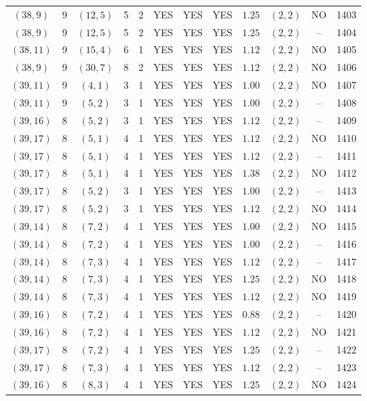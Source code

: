 \begin{longtable}{|c|c|c|c|c|c|c|c|c|c|c|c|}
$(38,9)$ & 9 & $(12,5)$ & 5 & 2 & YES & YES & YES & $1.25$ & $(2,2)$ & NO & 1403\\
$(38,9)$ & 9 & $(12,5)$ & 5 & 2 & YES & YES & YES & $1.25$ & $(2,2)$ & -- & 1404\\
$(38,11)$ & 9 & $(15,4)$ & 6 & 1 & YES & YES & YES & $1.12$ & $(2,2)$ & NO & 1405\\
$(38,9)$ & 9 & $(30,7)$ & 8 & 2 & YES & YES & YES & $1.12$ & $(2,2)$ & NO & 1406\\
$(39,11)$ & 9 & $(4,1)$ & 3 & 1 & YES & YES & YES & $1.00$ & $(2,2)$ & NO & 1407\\
$(39,11)$ & 9 & $(5,2)$ & 3 & 1 & YES & YES & YES & $1.00$ & $(2,2)$ & -- & 1408\\
$(39,16)$ & 8 & $(5,2)$ & 3 & 1 & YES & YES & YES & $1.12$ & $(2,2)$ & -- & 1409\\
$(39,17)$ & 8 & $(5,1)$ & 4 & 1 & YES & YES & YES & $1.12$ & $(2,2)$ & NO & 1410\\
$(39,17)$ & 8 & $(5,1)$ & 4 & 1 & YES & YES & YES & $1.12$ & $(2,2)$ & -- & 1411\\
$(39,17)$ & 8 & $(5,1)$ & 4 & 1 & YES & YES & YES & $1.38$ & $(2,2)$ & NO & 1412\\
$(39,17)$ & 8 & $(5,2)$ & 3 & 1 & YES & YES & YES & $1.00$ & $(2,2)$ & -- & 1413\\
$(39,17)$ & 8 & $(5,2)$ & 3 & 1 & YES & YES & YES & $1.12$ & $(2,2)$ & NO & 1414\\
$(39,14)$ & 8 & $(7,2)$ & 4 & 1 & YES & YES & YES & $1.00$ & $(2,2)$ & NO & 1415\\
$(39,14)$ & 8 & $(7,2)$ & 4 & 1 & YES & YES & YES & $1.00$ & $(2,2)$ & -- & 1416\\
$(39,14)$ & 8 & $(7,3)$ & 4 & 1 & YES & YES & YES & $1.12$ & $(2,2)$ & -- & 1417\\
$(39,14)$ & 8 & $(7,3)$ & 4 & 1 & YES & YES & YES & $1.25$ & $(2,2)$ & NO & 1418\\
$(39,14)$ & 8 & $(7,3)$ & 4 & 1 & YES & YES & YES & $1.12$ & $(2,2)$ & NO & 1419\\
$(39,16)$ & 8 & $(7,2)$ & 4 & 1 & YES & YES & YES & $0.88$ & $(2,2)$ & -- & 1420\\
$(39,16)$ & 8 & $(7,2)$ & 4 & 1 & YES & YES & YES & $1.12$ & $(2,2)$ & NO & 1421\\
$(39,17)$ & 8 & $(7,2)$ & 4 & 1 & YES & YES & YES & $1.25$ & $(2,2)$ & -- & 1422\\
$(39,17)$ & 8 & $(7,3)$ & 4 & 1 & YES & YES & YES & $1.12$ & $(2,2)$ & -- & 1423\\
$(39,16)$ & 8 & $(8,3)$ & 4 & 1 & YES & YES & YES & $1.25$ & $(2,2)$ & NO & 1424\\

\end{longtable}
